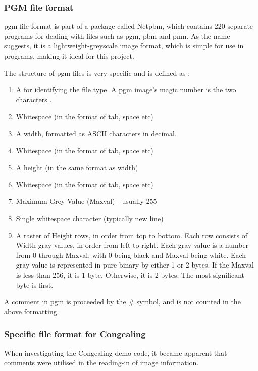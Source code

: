 \subsubsection{PGM file format}

\acrfull{pgm} file format is part of a package called Netpbm, which contains 220 separate programs for dealing with files such as \acrshort{pgm}, pbm and pnm. As the name suggests, it is a lightweight-greyscale image format, which is simple for use in programs, making it ideal for this project.

The structure of \acrshort{pgm} files is very specific and is defined as \cite{PGM_Format}:

\begin{enumerate}
  \item A  for identifying the file type. A pgm image's magic number is the two characters .
  \item Whitespace (in the format of tab, space etc)
  \item A width, formatted as ASCII characters in decimal.
  \item Whitespace (in the format of tab, space etc)
  \item A height (in the same format as width)
  \item Whitespace (in the format of tab, space etc)
  \item Maximum Grey Value (Maxval) - usually 255
  \item Single whitespace character (typically new line)
  \item A raster of Height rows, in order from top to bottom. Each row consists of Width gray values, in order from left to right. Each gray value is a number from 0 through Maxval, with 0 being black and Maxval being white. Each gray value is represented in pure binary by either 1 or 2 bytes. If the Maxval is less than 256, it is 1 byte. Otherwise, it is 2 bytes. The most significant byte is first.
\end{enumerate}

A comment in \acrshort{pgm} is proceeded by the \# symbol, and is not counted in the above formatting.

\subsubsection{Specific file format for \Gls{Congealing}}
\label{sssec:load}

 When investigating the \Gls{Congealing} demo code, it became apparent that comments were utilised in the reading-in of image information.

